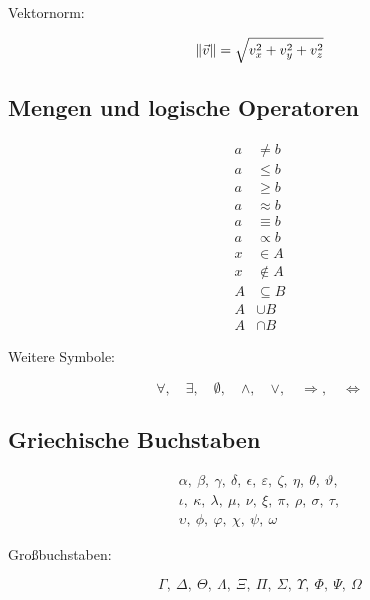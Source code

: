 \documentclass[11pt,a4paper]{scrartcl}
\DeclarePairedDelimiter{\norm}{\lVert}{\rVert}
\begin{document}
	Vektornorm:
	
	\begin{equation}
		\norm{\vec{v}}
		=\sqrt{v_x^2+v_y^2+v_z^2}
	\end{equation}
	
	\subsection{Mengen und logische Operatoren}
	
	\begin{align*}
		a &\neq b\\
		a &\leq b\\
		a &\geq b\\
		a &\approx b\\
		a &\equiv b\\
		a &\propto b\\
		x &\in A\\
		x &\notin A\\
		A &\subseteq B\\
		A &\cup B\\
		A &\cap B
	\end{align*}
	
	Weitere Symbole:
	
	\[
	\forall,\quad
	\exists,\quad
	\emptyset,\quad
	\land,\quad
	\lor,\quad
	\Rightarrow,\quad
	\Leftrightarrow
	\]
	
	\subsection{Griechische Buchstaben}
	
	\[
	\begin{gathered}
		\alpha,\ \beta,\ \gamma,\ \delta,\ \epsilon,\
		\varepsilon,\ \zeta,\ \eta,\ \theta,\ \vartheta,\\
		\iota,\ \kappa,\ \lambda,\ \mu,\ \nu,\
		\xi,\ \pi,\ \rho,\ \sigma,\ \tau,\\
		\upsilon,\ \phi,\ \varphi,\ \chi,\ \psi,\ \omega
	\end{gathered}
	\]
	
	Großbuchstaben:
	
	\[
	\Gamma,\ \Delta,\ \Theta,\ \Lambda,\
	\Xi,\ \Pi,\ \Sigma,\ \Upsilon,\
	\Phi,\ \Psi,\ \Omega
	\]
	
\end{document}
